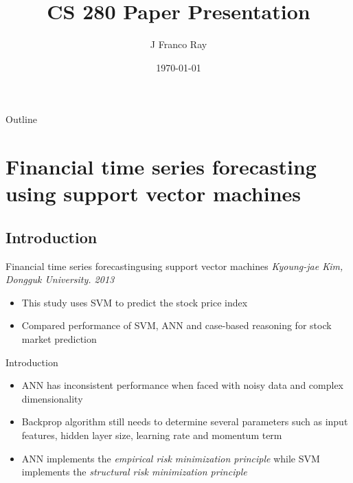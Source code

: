 \documentclass[10pt]{beamer}
\title{CS 280 Paper Presentation}
\author{J Franco Ray}
\date{\today}
\begin{document}
\begin{frame}
	\maketitle
\end{frame}

\begin{frame}[noframenumbering]{Outline}
	\tableofcontents
\end{frame}

\section{Financial time series forecasting using support vector machines}
\subsection*{Introduction}
\begin{frame}{Financial time series forecasting}{using support vector machines}
	\textit{Kyoung-jae Kim, Dongguk University. 2013}
	\begin{itemize}[<1->]
		\item This study uses SVM to predict the stock price index
		\item Compared performance of SVM, ANN and case-based reasoning for stock market prediction
	\end{itemize}
\end{frame}
\begin{frame}{Introduction}{}
	\begin{itemize}[<1->]
		\item ANN has inconsistent performance when faced with noisy data and complex dimensionality
		\item Backprop algorithm still needs to determine several parameters such as input features, hidden layer size, learning rate and momentum term
		\item ANN implements the \textit{empirical risk minimization principle} while SVM implements the \textit{structural risk minimization principle}
	\end{itemize}
\end{frame}
\end{document}
